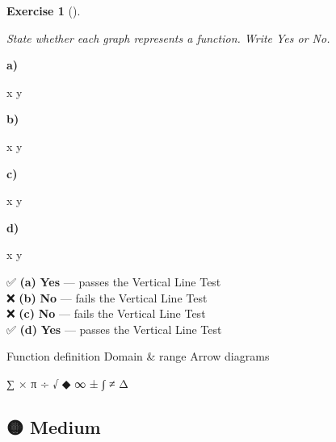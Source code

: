 \documentclass[
  letterpaper,
  DIV=11,
  numbers=noendperiod]{scrreprt}
\theoremstyle{definition}
\newtheorem{exercise}{Exercise}[chapter]
\theoremstyle{remark}
\begin{document}
\begin{exercise}[]\protect\hypertarget{exr-u7-34}{}\label{exr-u7-34}

\emph{State whether each graph represents a function. Write Yes or No.}

\textbf{a)}

x y

\textbf{b)}

x y

\textbf{c)}

x y

\textbf{d)}

x y

\begin{tcolorbox}[enhanced jigsaw, opacitybacktitle=0.6, coltitle=black, arc=.35mm, colframe=quarto-callout-tip-color-frame, colback=white, bottomrule=.15mm, left=2mm, colbacktitle=quarto-callout-tip-color!10!white, titlerule=0mm, opacityback=0, title=\textcolor{quarto-callout-tip-color}{\faLightbulb}\hspace{0.5em}{🔍 View Solutions}, leftrule=.75mm, breakable, rightrule=.15mm, bottomtitle=1mm, toptitle=1mm, toprule=.15mm]

✅ \textbf{(a)} \textbf{Yes} --- passes the Vertical Line Test\\
❌ \textbf{(b)} \textbf{No} --- fails the Vertical Line Test\\
❌ \textbf{(c)} \textbf{No} --- fails the Vertical Line Test\\
✅ \textbf{(d)} \textbf{Yes} --- passes the Vertical Line Test

\end{tcolorbox}

{Function definition} {Domain \& range} {Arrow diagrams}

\end{exercise}

∑ × π ÷ √ ◆ ∞ ± ∫ ≠ Δ

\subsection{🟡 Medium}
\end{document}
